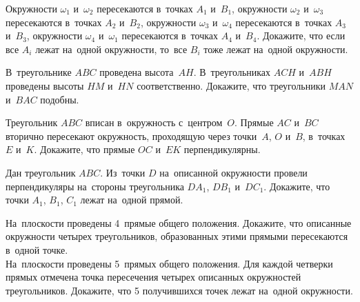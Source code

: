 \begin{problems}
\item
Окружности $\omega_1$ и~$\omega_2$ пересекаются в~точках $A_1$ и~$B_1$,
окружности $\omega_2$ и~$\omega_3$ пересекаются в~точках $A_2$ и~$B_2$,
окружности $\omega_3$ и~$\omega_4$ пересекаются в~точках $A_3$ и~$B_3$,
окружности $\omega_4$ и~$\omega_1$ пересекаются в~точках $A_4$ и~$B_4$.
Докажите, что если все $A_i$ лежат на~одной окружности, то~все $B_i$ тоже
лежат на~одной окружности.

\item
В~треугольнике $ABC$ проведена высота~$AH$.
В~треугольниках $ACH$ и~$ABH$ проведены высоты $HM$ и~$HN$ соответственно.
Докажите, что треугольники $MAN$ и~$BAC$ подобны.

\item
Треугольник $ABC$ вписан в~окружность с~центром~$O$.
Прямые $AC$ и~$BC$ вторично пересекают окружность, проходящую через точки~$A$,
$O$ и~$B$, в~точках $E$ и~$K$.
Докажите, что прямые $OC$ и~$EK$ перпендикулярны.

\item
Дан треугольник $ABC$.
Из~точки $D$ на~описанной окружности провели перпендикуляры на~стороны
треугольника $D A_1$, $D B_1$ и~$D C_1$.
Докажите, что точки $A_1$, $B_1$, $C_1$ лежат на~одной прямой.

\item
\subproblem
На~плоскости проведены 4~прямые общего положения.
Докажите, что описанные окружности четырех треугольников, образованных этими
прямыми пересекаются в~одной точке.
\\
\subproblem
На~плоскости проведены 5~прямых общего положения.
Для каждой четверки прямых отмечена точка пересечения четырех описанных
окружностей треугольников.
Докажите, что 5 получившихся точек лежат на~одной окружности.

\end{problems}

